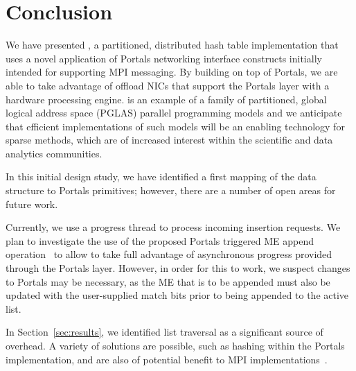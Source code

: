 \section{Conclusion}

We have presented \pdht, a partitioned, distributed hash table implementation
that uses a novel application of Portals networking interface constructs
initially intended for supporting MPI messaging.  By building \pdht on top of
Portals, we are able to take advantage of offload NICs that support the
Portals layer with a hardware processing engine.  \pdht is an example of a
family of partitioned, global logical address space (PGLAS) parallel
programming models and we anticipate that efficient implementations of such
models will be an enabling technology for sparse methods, which are of
increased interest within the scientific and data analytics communities.

In this initial design study, we have identified a first mapping of the \pdht
data structure to Portals primitives; however, there are a number of open areas
for future work.

Currently, we use a progress thread to process incoming insertion requests.  We
plan to investigate the use of the proposed Portals triggered ME append
operation~\cite{schneider:13} to allow \pdht to take full advantage of
asynchronous progress provided through the Portals layer.  However, in order
for this to work, we suspect changes to Portals may be necessary, as the ME
that is to be appended must also be updated with the user-supplied match bits
prior to being appended to the active list.

In Section~\ref{sec:results}, we identified list traversal as a significant
source of overhead.  A variety of solutions are possible, such as hashing
within the Portals implementation, and are also of potential benefit to MPI
implementations~\cite{flajslik:16}.

